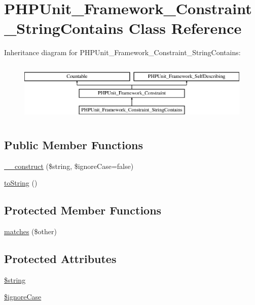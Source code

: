 \hypertarget{class_p_h_p_unit___framework___constraint___string_contains}{}\section{P\+H\+P\+Unit\+\_\+\+Framework\+\_\+\+Constraint\+\_\+\+String\+Contains Class Reference}
\label{class_p_h_p_unit___framework___constraint___string_contains}
Inheritance diagram for P\+H\+P\+Unit\+\_\+\+Framework\+\_\+\+Constraint\+\_\+\+String\+Contains\+:\begin{figure}[H]
\begin{center}
\leavevmode
\includegraphics[height=2.906574cm]{class_p_h_p_unit___framework___constraint___string_contains}
\end{center}
\end{figure}
\subsection*{Public Member Functions}
\begin{DoxyCompactItemize}
\item 
\mbox{\hyperlink{class_p_h_p_unit___framework___constraint___string_contains_a5d3922853689b3cf95d0b56133db4710}{\+\_\+\+\_\+construct}} (\$string, \$ignore\+Case=false)
\item 
\mbox{\hyperlink{class_p_h_p_unit___framework___constraint___string_contains_a5558c5d549f41597377fa1ea8a1cefa3}{to\+String}} ()
\end{DoxyCompactItemize}
\subsection*{Protected Member Functions}
\begin{DoxyCompactItemize}
\item 
\mbox{\hyperlink{class_p_h_p_unit___framework___constraint___string_contains_a9c9c337de483bbdbb9fa249a6c7c9cc5}{matches}} (\$other)
\end{DoxyCompactItemize}
\subsection*{Protected Attributes}
\begin{DoxyCompactItemize}
\item 
\mbox{\hyperlink{class_p_h_p_unit___framework___constraint___string_contains_a05bc82187ba145848edd864852f4bd37}{\$string}}
\item 
\mbox{\hyperlink{class_p_h_p_unit___framework___constraint___string_contains_a76b26ca72faf8384c4f8e767390feee9}{\$ignore\+Case}}
\end{DoxyCompactItemize}


